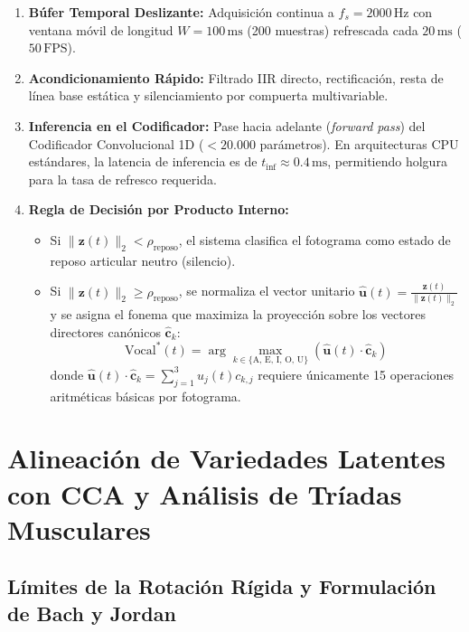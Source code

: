 \documentclass[11pt,a4paper,openany]{book}
\theoremstyle{definition}
\begin{document}
\begin{enumerate}
    \item \textbf{Búfer Temporal Deslizante:} Adquisición continua a $f_s = 2000\,\text{Hz}$ con ventana móvil de longitud $W = 100\,\text{ms}$ (200 muestras) refrescada cada $20\,\text{ms}$ ($50\,\text{FPS}$).
    \item \textbf{Acondicionamiento Rápido:} Filtrado IIR directo, rectificación, resta de línea base estática y silenciamiento por compuerta multivariable.
    \item \textbf{Inferencia en el Codificador:} Pase hacia adelante (\textit{forward pass}) del Codificador Convolucional 1D ($< 20.000$ parámetros). En arquitecturas CPU estándares, la latencia de inferencia es de $t_{\text{inf}} \approx 0.4\,\text{ms}$, permitiendo holgura para la tasa de refresco requerida.
    \item \textbf{Regla de Decisión por Producto Interno:}
    \begin{itemize}
        \item Si $\|\mathbf{z}(t)\|_2 < \rho_{\text{reposo}}$, el sistema clasifica el fotograma como estado de reposo articular neutro (silencio).
        \item Si $\|\mathbf{z}(t)\|_2 \ge \rho_{\text{reposo}}$, se normaliza el vector unitario $\hat{\mathbf{u}}(t) = \frac{\mathbf{z}(t)}{\|\mathbf{z}(t)\|_2}$ y se asigna el fonema que maximiza la proyección sobre los vectores directores canónicos $\hat{\mathbf{c}}_k$:
        \begin{equation}
            \text{Vocal}^*(t) = \arg\max_{k \in \{\text{A, E, I, O, U}\}} \left( \hat{\mathbf{u}}(t) \cdot \hat{\mathbf{c}}_k \right)
            \label{eq:regla_decision}
        \end{equation}
        donde $\hat{\mathbf{u}}(t) \cdot \hat{\mathbf{c}}_k = \sum_{j=1}^3 u_j(t) c_{k,j}$ requiere únicamente 15 operaciones aritméticas básicas por fotograma.
    \end{itemize}
\end{enumerate}

\section{Alineación de Variedades Latentes con CCA y Análisis de Tríadas Musculares}
\label{sec:cca_triadas}

\subsection{Límites de la Rotación Rígida y Formulación de Bach y Jordan}
\label{subsec:limites_so_d}
\end{document}
